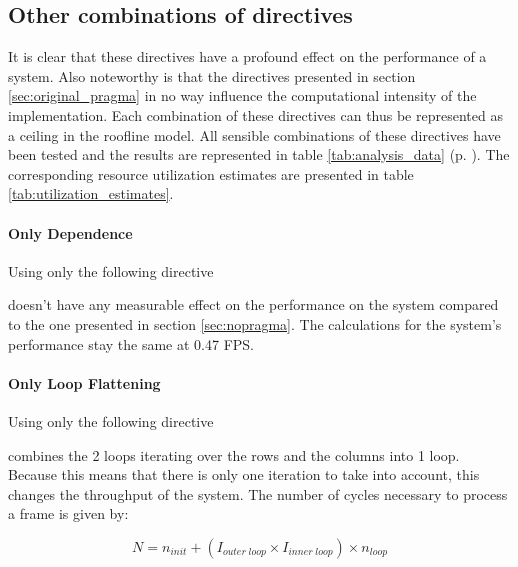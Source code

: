 


\subsection{Other combinations of directives}

It is clear that these directives have a profound effect on the performance of a system. Also noteworthy is that the directives presented in section \ref{sec:original_pragma} in no way influence the computational intensity of the implementation. Each combination of these directives can thus be represented as a ceiling in the roofline model.
All sensible combinations of these directives have been tested and the results are represented in table  
\ref{tab:analysis_data} (p. \pageref{tab:analysis_data}). The corresponding resource utilization estimates are presented in table \ref{tab:utilization_estimates}.

\paragraph{Only Dependence}
Using only the following directive


doesn't have any measurable effect on the performance on the system compared to the one presented in section \ref{sec:nopragma}. The calculations for the system's performance stay the same at 0.47 FPS.

\paragraph{Only Loop Flattening}
Using only the following directive


combines the 2 loops iterating over the rows and the columns into 1 loop. Because this means that there is only one iteration to take into account, this changes the throughput of the system. The number of cycles necessary to process a frame is given by:


\begin{equation}
N = n_{init} + (I_{outer\;loop} \times I_{inner\;loop}) \times n_{loop}
\end{equation}

